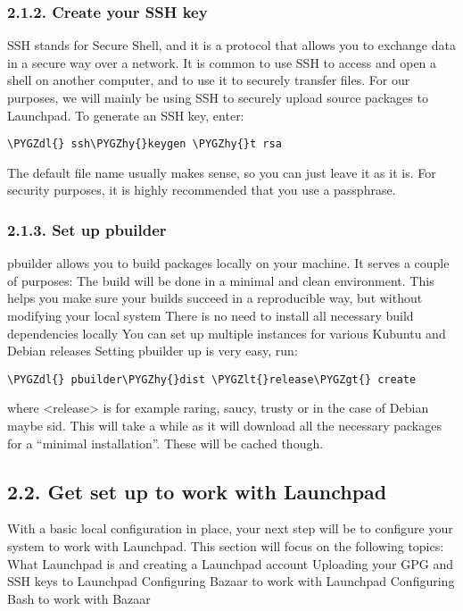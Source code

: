 \documentclass[letterpaper,10pt,english]{sphinxmanual}
\def\PYGZlt{\char`\<}
\def\PYGZgt{\char`\>}
\def\PYGZdl{\char`\$}
\def\PYGZhy{\char`\-}
\begin{document}
\subsubsection{2.1.2. Create your SSH key}
\label{docs/packaging_guide/getting_started:create-your-ssh-key}
SSH stands for Secure Shell, and it is a protocol that allows you to exchange data in a secure way over a network. It is common to use SSH to access and open a shell on another computer, and to use it to securely transfer files. For our purposes, we will mainly be using SSH to securely upload source packages to Launchpad.
To generate an SSH key, enter:

\begin{Verbatim}[commandchars=\\\{\}]
\PYGZdl{} ssh\PYGZhy{}keygen \PYGZhy{}t rsa
\end{Verbatim}

The default file name usually makes sense, so you can just leave it as it is. For security purposes, it is highly recommended that you use a passphrase.


\subsubsection{2.1.3. Set up pbuilder}
\label{docs/packaging_guide/getting_started:set-up-pbuilder}
pbuilder allows you to build packages locally on your machine. It serves a couple of purposes:
The build will be done in a minimal and clean environment. This helps you make sure your builds succeed in a reproducible way, but without modifying your local system
There is no need to install all necessary build dependencies locally
You can set up multiple instances for various Kubuntu and Debian releases
Setting pbuilder up is very easy, run:

\begin{Verbatim}[commandchars=\\\{\}]
\PYGZdl{} pbuilder\PYGZhy{}dist \PYGZlt{}release\PYGZgt{} create
\end{Verbatim}

where \textless{}release\textgreater{} is for example raring, saucy, trusty or in the case of Debian maybe sid. This will take a while as it will download all the necessary packages for a “minimal installation”. These will be cached though.


\subsection{2.2. Get set up to work with Launchpad}
\label{docs/packaging_guide/getting_started:get-set-up-to-work-with-launchpad}
With a basic local configuration in place, your next step will be to configure your system to work with Launchpad. This section will focus on the following topics:
What Launchpad is and creating a Launchpad account
Uploading your GPG and SSH keys to Launchpad
Configuring Bazaar to work with Launchpad
Configuring Bash to work with Bazaar
\end{document}
